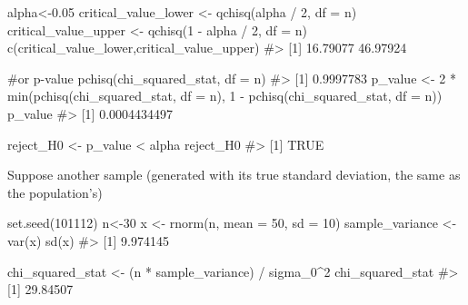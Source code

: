 \documentclass[
  letterpaper,
  DIV=11,
  numbers=noendperiod]{scrreprt}
\newenvironment{Shaded}{\begin{snugshade}}{\end{snugshade}}
\newcommand{\AttributeTok}[1]{\textcolor[rgb]{0.40,0.45,0.13}{#1}}
\newcommand{\CommentTok}[1]{\textcolor[rgb]{0.37,0.37,0.37}{#1}}
\newcommand{\DecValTok}[1]{\textcolor[rgb]{0.68,0.00,0.00}{#1}}
\newcommand{\FloatTok}[1]{\textcolor[rgb]{0.68,0.00,0.00}{#1}}
\newcommand{\FunctionTok}[1]{\textcolor[rgb]{0.28,0.35,0.67}{#1}}
\newcommand{\NormalTok}[1]{\textcolor[rgb]{0.00,0.23,0.31}{#1}}
\newcommand{\OtherTok}[1]{\textcolor[rgb]{0.00,0.23,0.31}{#1}}
\newcommand{\SpecialCharTok}[1]{\textcolor[rgb]{0.37,0.37,0.37}{#1}}
\begin{document}
\begin{Shaded}
\begin{Highlighting}[]
\NormalTok{alpha}\OtherTok{\textless{}{-}}\FloatTok{0.05}
\NormalTok{critical\_value\_lower }\OtherTok{\textless{}{-}} \FunctionTok{qchisq}\NormalTok{(alpha }\SpecialCharTok{/} \DecValTok{2}\NormalTok{, }\AttributeTok{df =}\NormalTok{ n)}
\NormalTok{critical\_value\_upper }\OtherTok{\textless{}{-}} \FunctionTok{qchisq}\NormalTok{(}\DecValTok{1} \SpecialCharTok{{-}}\NormalTok{ alpha }\SpecialCharTok{/} \DecValTok{2}\NormalTok{, }\AttributeTok{df =}\NormalTok{ n)}
\FunctionTok{c}\NormalTok{(critical\_value\_lower,critical\_value\_upper)}
\CommentTok{\#\textgreater{} [1] 16.79077 46.97924}

\CommentTok{\#or p{-}value}
\FunctionTok{pchisq}\NormalTok{(chi\_squared\_stat, }\AttributeTok{df =}\NormalTok{ n)}
\CommentTok{\#\textgreater{} [1] 0.9997783}
\NormalTok{p\_value }\OtherTok{\textless{}{-}} \DecValTok{2} \SpecialCharTok{*} \FunctionTok{min}\NormalTok{(}\FunctionTok{pchisq}\NormalTok{(chi\_squared\_stat, }\AttributeTok{df =}\NormalTok{ n), }\DecValTok{1} \SpecialCharTok{{-}} \FunctionTok{pchisq}\NormalTok{(chi\_squared\_stat, }\AttributeTok{df =}\NormalTok{ n))}
\NormalTok{p\_value}
\CommentTok{\#\textgreater{} [1] 0.0004434497}

\NormalTok{reject\_H0 }\OtherTok{\textless{}{-}}\NormalTok{ p\_value }\SpecialCharTok{\textless{}}\NormalTok{ alpha}
\NormalTok{reject\_H0}
\CommentTok{\#\textgreater{} [1] TRUE}
\end{Highlighting}
\end{Shaded}

Suppose another sample (generated with its true standard deviation, the
same as the population's)

\begin{Shaded}
\begin{Highlighting}[]
\FunctionTok{set.seed}\NormalTok{(}\DecValTok{101112}\NormalTok{)}
\NormalTok{n}\OtherTok{\textless{}{-}}\DecValTok{30}
\NormalTok{x }\OtherTok{\textless{}{-}} \FunctionTok{rnorm}\NormalTok{(n, }\AttributeTok{mean =} \DecValTok{50}\NormalTok{, }\AttributeTok{sd =} \DecValTok{10}\NormalTok{)}
\NormalTok{sample\_variance }\OtherTok{\textless{}{-}} \FunctionTok{var}\NormalTok{(x)}
\FunctionTok{sd}\NormalTok{(x)}
\CommentTok{\#\textgreater{} [1] 9.974145}
\end{Highlighting}
\end{Shaded}

\begin{Shaded}
\begin{Highlighting}[]
\NormalTok{chi\_squared\_stat }\OtherTok{\textless{}{-}}\NormalTok{ (n }\SpecialCharTok{*}\NormalTok{ sample\_variance) }\SpecialCharTok{/}\NormalTok{ sigma\_0}\SpecialCharTok{\^{}}\DecValTok{2}
\NormalTok{chi\_squared\_stat}
\CommentTok{\#\textgreater{} [1] 29.84507}
\end{Highlighting}
\end{Shaded}
\end{document}

